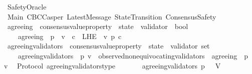 %
\begin{isabellebody}%
%
%
\isadelimtheory
%
\endisadelimtheory
%
\isatagtheory
{}\isamarkupfalse%
\ SafetyOracle\isanewline
\isanewline
{}\ Main\ CBCCasper\ LatestMessage\ StateTransition\ ConsensusSafety\isanewline
\isanewline
{}%
\endisatagtheory
{\isafoldtheory}%
%
\isadelimtheory
\isanewline
%
\endisadelimtheory
\isanewline
\isanewline
\isanewline
\isanewline
\isanewline
\isanewline
\isanewline
\isanewline
\isanewline
\isanewline
\isanewline
\isanewline
\isanewline
\isanewline
\isanewline
\isanewline
\isanewline
\isanewline
{}\isamarkupfalse%
\ agreeing\ {\isacharcolon}{\isacharcolon}\ {\isachardoublequoteopen}{\isacharparenleft}consensus{\isacharunderscore}value{\isacharunderscore}property\ {\isacharasterisk}\ state\ {\isacharasterisk}\ validator{\isacharparenright}\ {\isasymRightarrow}\ bool{\isachardoublequoteclose}\isanewline
\ \ \isanewline
\ \ \ \ {\isachardoublequoteopen}agreeing\ {\isacharequal}\ {\isacharparenleft}{\isasymlambda}{\isacharparenleft}p{\isacharcomma}\ {\isasymsigma}{\isacharcomma}\ v{\isacharparenright}{\isachardot}\ {\isasymforall}\ c\ {\isasymin}\ L{\isacharunderscore}H{\isacharunderscore}E\ {\isasymsigma}\ v{\isachardot}\ p\ c{\isacharparenright}{\isachardoublequoteclose}\isanewline
\isanewline
\isanewline
{}\isamarkupfalse%
\ agreeing{\isacharunderscore}validators\ {\isacharcolon}{\isacharcolon}\ {\isachardoublequoteopen}{\isacharparenleft}consensus{\isacharunderscore}value{\isacharunderscore}property\ {\isacharasterisk}\ state{\isacharparenright}\ {\isasymRightarrow}\ validator\ set{\isachardoublequoteclose}\isanewline
\ \ \isanewline
\ \ \ \ {\isachardoublequoteopen}agreeing{\isacharunderscore}validators\ {\isacharequal}\ {\isacharparenleft}{\isasymlambda}{\isacharparenleft}p{\isacharcomma}\ {\isasymsigma}{\isacharparenright}{\isachardot}{\isacharbraceleft}v\ {\isasymin}\ observed{\isacharunderscore}non{\isacharunderscore}equivocating{\isacharunderscore}validators\ {\isasymsigma}{\isachardot}\ agreeing\ \ {\isacharparenleft}p{\isacharcomma}\ {\isasymsigma}{\isacharcomma}\ v{\isacharparenright}{\isacharbraceright}{\isacharparenright}{\isachardoublequoteclose}\isanewline
\isanewline
{}\isamarkupfalse%
\ {\isacharparenleft}\ Protocol{\isacharparenright}\ agreeing{\isacharunderscore}validators{\isacharunderscore}type\ {\isacharcolon}\isanewline
\ \ {\isachardoublequoteopen}{\isasymforall}\ {\isasymsigma}\ {\isasymin}\ {\isasymSigma}{\isachardot}\ agreeing{\isacharunderscore}validators\ {\isacharparenleft}p{\isacharcomma}\ {\isasymsigma}{\isacharparenright}\ {\isasymsubseteq}\ V{\isachardoublequoteclose}\isanewline

\end{isabellebody}
